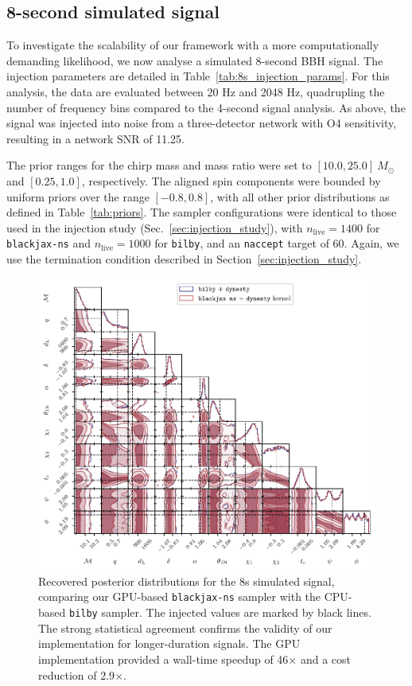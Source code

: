 \documentclass[fleqn,usenatbib]{mnras}
\begin{document}
\subsection{8-second simulated signal}
\label{sec:8s_simulated_signal}

To investigate the scalability of our framework with a more
computationally demanding likelihood, we now analyse a simulated
8-second BBH signal. The injection parameters are detailed in
Table~\ref{tab:8s_injection_params}. For this analysis, the data are
evaluated between 20 Hz and 2048 Hz, quadrupling the number of
frequency bins compared to the 4-second signal analysis. As above, the signal was
injected into noise from a three-detector network with O4 sensitivity,
resulting in a network SNR of 11.25.

The prior ranges for the chirp mass and mass ratio were set to
$[10.0, 25.0]~M_{\odot}$ and $[0.25, 1.0]$, respectively. The aligned
spin components were bounded by uniform priors over the range
$[-0.8, 0.8]$, with all other prior distributions as defined in
Table~\ref{tab:priors}. The sampler configurations were identical to
those used in the injection study (Sec.~\ref{sec:injection_study}), with
$n_{\text{live}}=1400$ for \texttt{blackjax-ns} and
$n_{\text{live}}=1000$ for \texttt{bilby}, and an \texttt{naccept}
target of 60. Again, we use the 
termination condition described in Section~\ref{sec:injection_study}.

\begin{figure}
    \centering
    \includegraphics{figures/8s_corner_comparison.pdf}
    \caption{Recovered posterior distributions for the 8s simulated
    signal, comparing our GPU-based \texttt{blackjax-ns} sampler
    with the CPU-based \texttt{bilby} sampler. The injected values
    are marked by black lines. The strong statistical agreement confirms
    the validity of our implementation for longer-duration signals.
    The GPU implementation provided a wall-time speedup of 46$\times$ and a cost reduction of 2.9$\times$.}
    \label{fig:8s_posteriors}
\end{figure}
\end{document}
